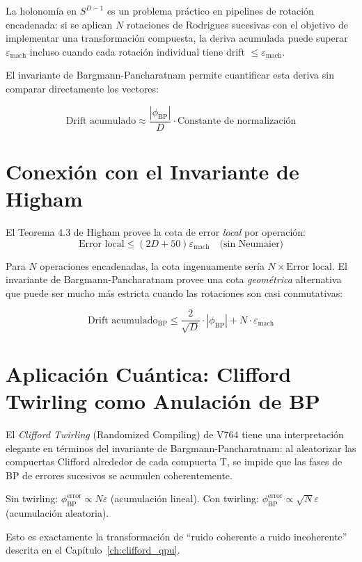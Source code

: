 La holonomía en $S^{D-1}$ es un problema práctico en pipelines de rotación encadenada:
si se aplican $N$ rotaciones de Rodrigues sucesivas con el objetivo de implementar
una transformación compuesta, la deriva acumulada puede superar $\varepsilon_{\text{mach}}$
incluso cuando cada rotación individual tiene drift $\le \varepsilon_{\text{mach}}$.

El invariante de Bargmann-Pancharatnam permite cuantificar esta deriva sin comparar
directamente los vectores:

\begin{equation}
\text{Drift acumulado} \approx \frac{|\phi_{\text{BP}}|}{D} \cdot \text{Constante de normalización}
\end{equation}

\section{Conexión con el Invariante de Higham}

El Teorema 4.3 de Higham provee la cota de error \textit{local} por operación:
\begin{equation}
\text{Error local} \le (2D + 50)\varepsilon_{\text{mach}} \quad \text{(sin Neumaier)}
\end{equation}

Para $N$ operaciones encadenadas, la cota ingenuamente sería $N \times \text{Error local}$.
El invariante de Bargmann-Pancharatnam provee una cota \textit{geométrica} alternativa
que puede ser mucho más estricta cuando las rotaciones son casi conmutativas:

\begin{equation}
\text{Drift acumulado}_{\text{BP}} \le \frac{2}{\sqrt{D}} \cdot |\phi_{\text{BP}}| + N \cdot \varepsilon_{\text{mach}}
\end{equation}

\section{Aplicación Cuántica: Clifford Twirling como Anulación de BP}

El \textit{Clifford Twirling} (Randomized Compiling) de V764 tiene una interpretación
elegante en términos del invariante de Bargmann-Pancharatnam: al aleatorizar las
compuertas Clifford alrededor de cada compuerta T, se impide que las fases de BP
de errores sucesivos se acumulen coherentemente.

Sin twirling: $\phi_{\text{BP}}^{\text{error}} \propto N\varepsilon$ (acumulación lineal).
Con twirling: $\phi_{\text{BP}}^{\text{error}} \propto \sqrt{N}\varepsilon$ (acumulación aleatoria).

Esto es exactamente la transformación de ``ruido coherente a ruido incoherente'' descrita
en el Capítulo~\ref{ch:clifford_qpu}.
